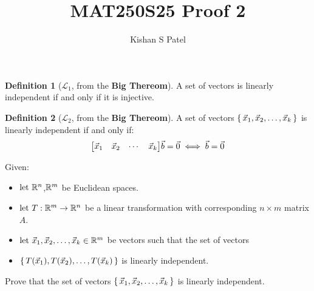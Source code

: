 \documentclass{exam}
\theoremstyle{plain}
\theoremstyle{definition}
\newtheorem{definition}{Definition}
\begin{document}
\title{MAT250S25 Proof 2}
\author{Kishan S Patel}
\maketitle

\begin{definition}[$\mathcal L_1$, from the \textbf{Big Thereom}\textsuperscript{\texttrademark}]
	A set of vectors is linearly independent if and only if it is injective.
\end{definition}

\begin{definition}[$\mathcal L_2$, from the \textbf{Big Thereom}\textsuperscript{\texttrademark}]
	A set of vectors $\set{\vec x_1, \vec x_2, \dots, \vec x_k}$ is linearly independent if and only if:
	$$
		{ \begin{bmatrix} \vec x_1 & \vec x_2 & \cdots & \vec x_k \end{bmatrix} }\vec b  = \vec 0 \iff \vec b = \vec 0
	$$
\end{definition}

Given:
\begin{itemize}
	\item ${\text{let } } {\mathbb R}^n$,${\mathbb R}^m$ be Euclidean spaces.
	\item ${\text{let } } T:{\mathbb R}^m\to{\mathbb R}^ n$ be a linear transformation with corresponding $n\times m$ matrix $A$.
	\item ${\text{let } } \vec x_1, \vec x_2, \dots, \vec x_k \in {\mathbb R}^ m$ be vectors such that the set of vectors
	\item $\set{T(\vec x_1), T(\vec x_2), \dots, T(\vec x_k)}$ is linearly independent.
\end{itemize}

Prove that the set of vectors $\set{\vec x_1, \vec x_2, \dots, \vec x_k}$ is linearly independent.

\renewcommand\qedsymbol{QED}


\end{document}
